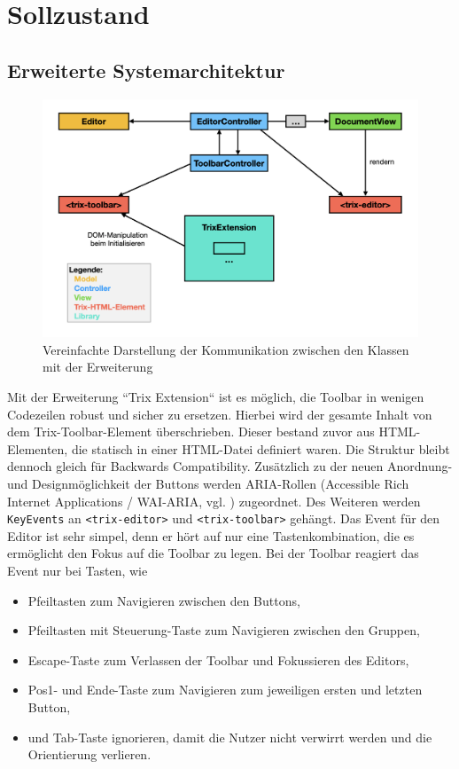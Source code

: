 \section{Sollzustand}

\subsection{Erweiterte Systemarchitektur}

\begin{figure}[H]
\begin{center}
	\includegraphics[scale=.4]{images/sysarch_extension.png}
\end{center}
	\caption{Vereinfachte Darstellung der Kommunikation zwischen den Klassen mit der Erweiterung}
\end{figure}

Mit der Erweiterung ``Trix Extension`` ist es möglich, die Toolbar in wenigen Codezeilen robust und sicher zu ersetzen. Hierbei wird der gesamte Inhalt von dem Trix-Toolbar-Element überschrieben. Dieser bestand zuvor aus HTML-Elementen, die statisch in einer HTML-Datei definiert waren. Die Struktur bleibt dennoch gleich für Backwards Compatibility. Zusätzlich zu der neuen Anordnung- und Designmöglichkeit der Buttons werden ARIA-Rollen (Accessible Rich Internet Applications / WAI-ARIA, vgl. \cite{wai_aria_2017}) zugeordnet. Des Weiteren werden \texttt{KeyEvents} an \texttt{<trix-editor>} und \texttt{<trix-toolbar>} gehängt. Das Event für den Editor ist sehr simpel, denn er hört auf nur eine Tastenkombination, die es ermöglicht den Fokus auf die Toolbar zu legen. Bei der Toolbar reagiert das Event nur bei Tasten, wie

\begin{itemize}
	\item Pfeiltasten zum Navigieren zwischen den Buttons,
	\item Pfeiltasten mit Steuerung-Taste zum Navigieren zwischen den Gruppen,
	\item Escape-Taste zum Verlassen der Toolbar und Fokussieren des Editors,
	\item Pos1- und Ende-Taste zum Navigieren zum jeweiligen ersten und letzten Button,
	\item und Tab-Taste ignorieren, damit die Nutzer nicht verwirrt werden und die Orientierung verlieren.
\end{itemize}

